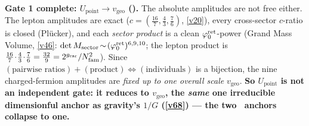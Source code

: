 \begin{keybox}
\smallskip\noindent\textbf{Gate 1 complete: $U_{\mathrm{point}}\to v_{\mathrm{geo}}$ ().}
The absolute amplitudes are not free either. The lepton amplitudes are exact ($c=(\tfrac{16}7,\tfrac43,\tfrac76)$,
\vref{v20}), every cross-sector $c$-ratio is closed (Pl\"ucker), and each \emph{sector product} is a clean
$\varphi_0^{\mathrm{ret}}$-power (Grand Mass Volume, \vref{v46}: $\det M_{\rm sector}\!\sim\!(\varphi_0^{\mathrm{ret}})^{6,9,10}$; the lepton product is
$\tfrac{16}7\!\cdot\!\tfrac43\!\cdot\!\tfrac76=\tfrac{32}9=2^{g_{\mathrm{car}}}/N_{\mathrm{fam}}^2$). Since $(\text{pairwise
ratios})+(\text{product})\Leftrightarrow(\text{individuals})$ is a bijection, the nine charged-fermion
amplitudes are \emph{fixed up to one overall scale} $v_{\mathrm{geo}}$. \textbf{So $U_{\mathrm{point}}$ is not an
independent gate: it reduces to $v_{\mathrm{geo}}$, the \emph{same} one irreducible dimensionful anchor as
gravity's $1/G$ (\vref{v68}) --- the two \mO\ anchors collapse to one.}
\end{keybox}

